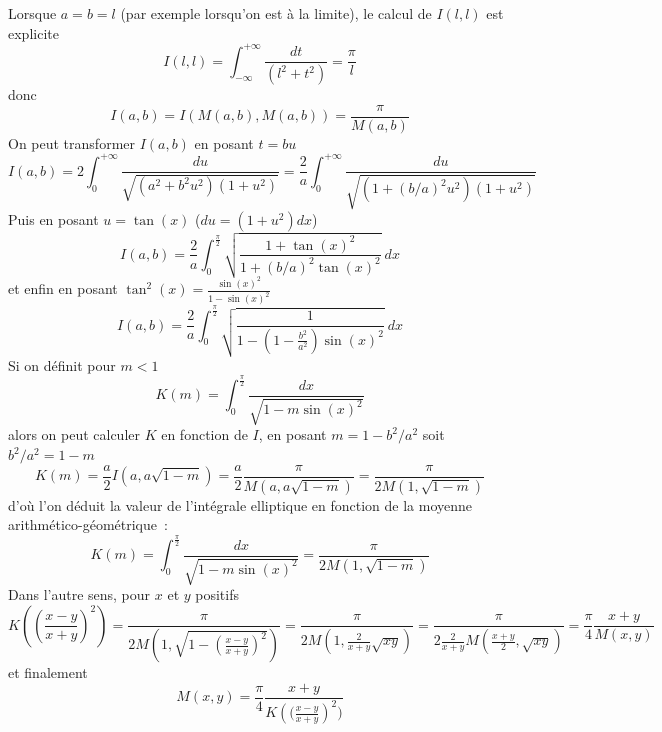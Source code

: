 \documentclass[a4paper,11pt]{article}
\begin{document}
Lorsque $a=b=l$ (par exemple lorsqu'on est \`a la limite), 
le calcul de $I(l,l)$ est explicite
\[ I(l,l)=\int_{-\infty}^{+\infty}  \frac{dt}{(l^2+t^2)} = \frac{\pi}{l}\]
donc
\[ I(a,b)=I(M(a,b),M(a,b))=\frac{\pi}{M(a,b)}\]
On peut transformer $I(a,b)$ en posant $t=bu$
\[ I(a,b)=2\int_{0}^{+\infty}  \frac{du}{\sqrt{(a^2+b^2u^2)(1+u^2)}}
= \frac{2}{a} \int_{0}^{+\infty}  \frac{du}{\sqrt{(1+(b/a)^2u^2)(1+u^2)}} \]
Puis en posant $u=\tan(x)$ ($du=(1+u^2) dx$)
\[ I(a,b)=\frac{2}{a} \int_0^{\frac{\pi}{2}} 
\sqrt{\frac{1+\tan(x)^2}{1+(b/a)^2\tan(x)^2}} \ dx \]
et enfin en posant $\tan^2(x)=\frac{\sin(x)^2}{1-\sin(x)^2}$
\[ I(a,b)= \frac{2}{a} \int_0^{\frac{\pi}{2}}  
\sqrt{ \frac{1}{1-(1-\frac{b^2}{a^2})\sin(x)^2} } \ dx\]
Si on d\'efinit pour $m<1$
\[ K(m)=\int_0^{\frac{\pi}{2}} \frac{dx}{\sqrt{1-m \sin(x)^2}} \]
alors on peut calculer $K$ en fonction de $I$, en posant
$m=1-b^2/a^2$ soit $b^2/a^2=1-m$
\[ K(m)=\frac{a}{2} I(a,a\sqrt{1-m})=\frac{a}{2}\frac{\pi}{M(a,a\sqrt{1-m})}
=\frac{\pi}{2M(1,\sqrt{1-m})} 
\]
d'o\`u l'on d\'eduit la valeur de l'int\'egrale elliptique en fonction
de la moyenne arithm\'etico-g\'eom\'etrique~:
\begin{equation} \label{eq:K}
K(m)=\int_0^{\frac{\pi}{2}} \frac{dx}{\sqrt{1-m \sin(x)^2}}= 
\frac{\pi}{2M(1,\sqrt{1-m})} 
\end{equation}
Dans l'autre sens, pour $x$ et $y$ positifs
\[ K( (\frac{x-y}{x+y})^2 )=  \frac{\pi}{2M(1,\sqrt{1-(\frac{x-y}{x+y})^2})}
=  \frac{\pi}{2M(1,\frac{2}{x+y}\sqrt{xy})}
= \frac{\pi}{2 \frac{2}{x+y} M(\frac{x+y}{2},\sqrt{xy}) }
= \frac{\pi}{4} \frac{x+y}{M(x,y)}
\]
et finalement
\[ M(x,y)=\frac{\pi}{4} \frac{x+y}{ K\left( (\frac{x-y}{x+y}\right)^2 )}\]
\end{document}
